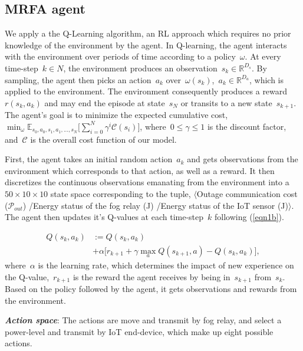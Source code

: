 \documentclass[journal]{IEEEtran}
\begin{document}
\subsection{MRFA agent}
We apply a the Q-Learning algorithm, an RL approach which requires no prior knowledge of the environment by the agent. In Q-learning, the agent interacts with the environment over periods of time according to a policy~$\omega$. At every time-step~$k \in N$, the environment produces an observation~$s_{k} \in \mathbb{R}^{D_s}$. By sampling, the agent then picks an action~$a_{k}$ over~$\omega(s_{k})$,~$a_{k} \in \mathbb{R}^{D_a}$, which is applied to the environment. The environment consequently produces a reward~$r(s_{k}, a_{k})$ and may end the episode at state~$s_{N}$ or transits to a new state~$s_{k + 1}$. The agent's goal is to minimize the expected cumulative cost,~$\min_{\omega} \mathbb{E}_{s_0, a_0, s_1, a_1, ..., s_N} \Big[ \sum_{i=0}^{N} \gamma^i \mathcal{C}(s_i) \Big]$, where~$0 \leq \gamma \leq 1$ is the discount factor, and~$\mathcal{C}$ is the overall cost function of our model.

First, the agent takes an initial random action~$a_{k}$ and gets observations from the environment which corresponds to that action, as well as a reward. It then discretizes the continuous observations emanating from the environment into a~$50 \times 10 \times 10$ state space corresponding to the tuple, $\langle$Outage communication cost ($\mathcal{P}_{out}$) /Energy status of the fog relay (J) /Energy status of the IoT sensor (J)$\rangle$. The agent then updates it's Q-values at each time-step~$k$ following (\ref{eqn1b}).

\begin{equation}\label{eqn1b}
\begin{split}
Q(s_k, a_k) &:= Q(s_k, a_k)\\
& + \alpha \Big[ r_{k + 1} + \gamma \max_{a}  Q(s_{k + 1}, a) -  Q(s_k, a_k) \Big],
   \end{split}
\end{equation}
where~$\alpha$ is the learning rate, which determines the impact of new experience on the Q-value,~$r_{k + 1}$ is the reward the agent receives by being in~$s_{k + 1}$ from~$s_{k}$. Based on the policy followed by the agent, it gets observations and rewards from the environment.

\emph{\textbf{Action space}}: The actions are move and transmit by fog relay, and select a power-level and transmit by IoT end-device, which make up eight possible actions.
\end{document}
